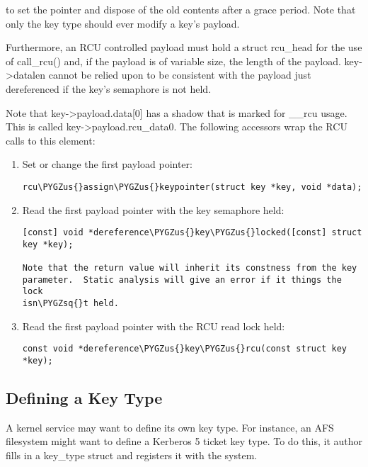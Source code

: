 \documentclass[a4paper,8pt,english]{sphinxmanual}
\def\PYGZus{\char`\_}
\def\PYGZsq{\char`\'}
\renewcommand\PYGZsq{\textquotesingle}
\begin{document}
\begin{enumerate}
to set the pointer and dispose of the old contents after a grace period.
Note that only the key type should ever modify a key's payload.

Furthermore, an RCU controlled payload must hold a struct rcu\_head for the
use of call\_rcu() and, if the payload is of variable size, the length of
the payload. key-\textgreater{}datalen cannot be relied upon to be consistent with the
payload just dereferenced if the key's semaphore is not held.

Note that key-\textgreater{}payload.data{[}0{]} has a shadow that is marked for \_\_rcu
usage.  This is called key-\textgreater{}payload.rcu\_data0.  The following accessors
wrap the RCU calls to this element:
\begin{enumerate}
\item {} 
Set or change the first payload pointer:

\begin{Verbatim}[commandchars=\\\{\}]
rcu\PYGZus{}assign\PYGZus{}keypointer(struct key *key, void *data);
\end{Verbatim}

\item {} 
Read the first payload pointer with the key semaphore held:

\begin{Verbatim}[commandchars=\\\{\}]
       [const] void *dereference\PYGZus{}key\PYGZus{}locked([const] struct key *key);

Note that the return value will inherit its constness from the key
parameter.  Static analysis will give an error if it things the lock
isn\PYGZsq{}t held.
\end{Verbatim}

\item {} 
Read the first payload pointer with the RCU read lock held:

\begin{Verbatim}[commandchars=\\\{\}]
const void *dereference\PYGZus{}key\PYGZus{}rcu(const struct key *key);
\end{Verbatim}

\end{enumerate}

\end{enumerate}


\subsection{Defining a Key Type}
\label{security/keys/core:defining-a-key-type}
A kernel service may want to define its own key type. For instance, an AFS
filesystem might want to define a Kerberos 5 ticket key type. To do this, it
author fills in a key\_type struct and registers it with the system.
\end{document}
